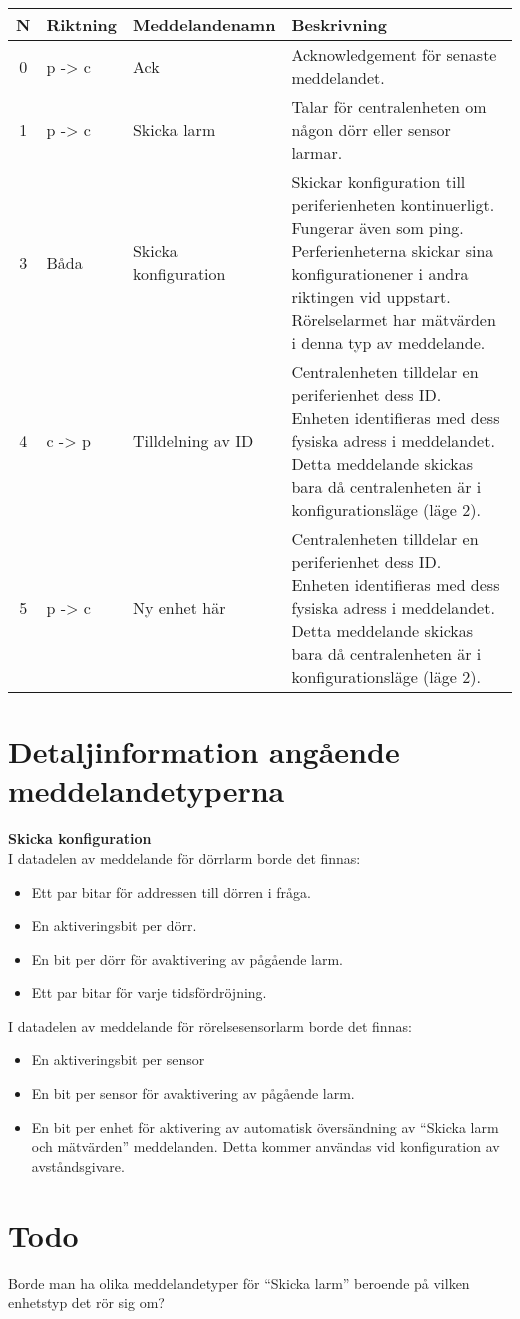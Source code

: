 \begin{table}[H]
	\begin{tabular}{|c|l|p{2.6cm}|p{6cm}|}
		\hline
		N& Riktning & Meddelandenamn & Beskrivning \\ \hline \hline
		0 & p -> c & Ack & Acknowledgement för senaste meddelandet. \\ \hline
		1 & p -> c & Skicka larm & Talar för centralenheten om någon dörr eller sensor larmar. \\ \hline
		3 & Båda & Skicka konfiguration & Skickar konfiguration till periferienheten kontinuerligt. Fungerar även som ping. Perferienheterna skickar sina konfigurationener i andra riktingen vid uppstart. Rörelselarmet har mätvärden i denna typ av meddelande. \\ \hline
		4 & c -> p & Tilldelning av ID & Centralenheten tilldelar en periferienhet dess ID. Enheten identifieras med dess fysiska adress i meddelandet. Detta meddelande skickas bara då centralenheten är i konfigurationsläge (läge  2). \\ \hline
		5 & p -> c & Ny enhet här & Centralenheten tilldelar en periferienhet dess ID. Enheten identifieras med dess fysiska adress i meddelandet. Detta meddelande skickas bara då centralenheten är i konfigurationsläge (läge  2). \\ \hline
	\end{tabular}
	\label{tab:meddelandetyper}
\end{table}

\section*{Detaljinformation angående meddelandetyperna}
\label{sec:detaljinfo}
\textbf{Skicka konfiguration} \\
I datadelen av meddelande för dörrlarm borde det finnas:
\begin{itemize}
	\item Ett par bitar för addressen till dörren i fråga.
	\item En aktiveringsbit per dörr.
	\item En bit per dörr för avaktivering av pågående larm.
	\item Ett par bitar för varje tidsfördröjning.
\end{itemize}

I datadelen av meddelande för rörelsesensorlarm borde det finnas:
\begin{itemize}
	\item En aktiveringsbit per sensor
	\item En bit per sensor för avaktivering av pågående larm.
	\item En bit per enhet för aktivering av automatisk översändning av “Skicka larm och mätvärden” meddelanden. Detta kommer användas vid konfiguration av avståndsgivare.
\end{itemize}

\section*{Todo}
\label{sec:todo}
Borde man ha olika meddelandetyper för “Skicka larm” beroende på vilken enhetstyp det rör sig om?
